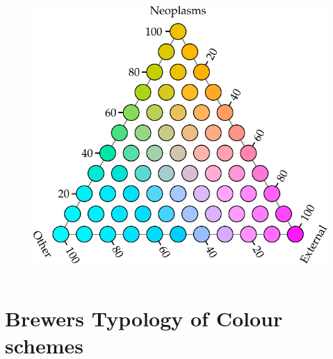 \documentclass{beamer}
\begin{document}
\begin{frame}
\begin{columns}[c]
\begin{figure}[htb!]
\includegraphics[width = \textwidth]{../fig/plot-tern_balance_lgnd.pdf}
\end{figure}

\end{columns}

\end{frame}

\section{Brewers Typology of Colour schemes} %
\end{document}
